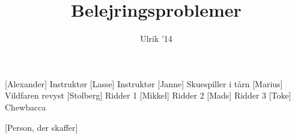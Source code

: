 \documentclass[a4paper,11pt]{article}
\title{Belejringsproblemer}
\author{Ulrik '14}
\begin{document}
\maketitle

\begin{roles}
[Alexander] Instruktør
[Lasse] Instruktør
[Janne] Skuespiller i tårn
[Marius] Vildfaren revyst
[Stolberg] Ridder 1
[Mikkel] Ridder 2
[Mads] Ridder 3
[Toke] Chewbacca
\end{roles}

\begin{props}
[Person, der skaffer]
\end{props}


\begin{sketch}


\end{sketch}
\end{document}
